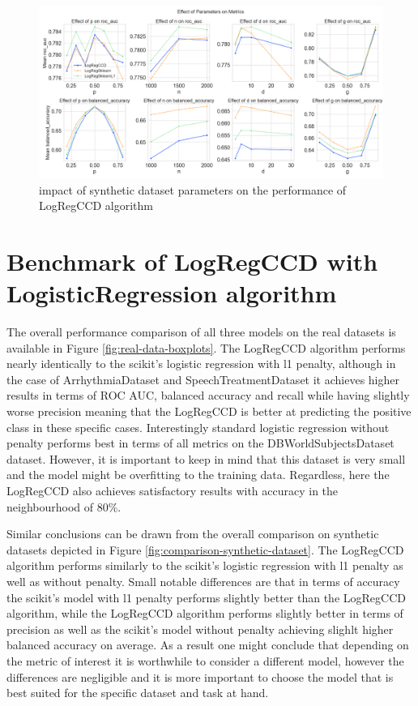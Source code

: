 \documentclass[12pt]{article}
\begin{document}
\begin{figure}[h]
    \centering
  \includegraphics[width=\textwidth]{../results/parameter_facet_grid.png}
    \caption{impact of synthetic dataset parameters on the performance of LogRegCCD algorithm}
    \label{fig:synthetic-dataset-parameters}
  \end{figure}

\section{Benchmark of LogRegCCD with LogisticRegression algorithm}






The overall performance comparison of all three models on the real datasets is available in Figure \ref{fig:real-data-boxplots}. The LogRegCCD algorithm performs nearly identically to the scikit's logistic regression with l1 penalty, although in the case of ArrhythmiaDataset and SpeechTreatmentDataset it achieves higher results in terms of ROC AUC, balanced accuracy and recall while having slightly worse precision meaning that the LogRegCCD is better at predicting the positive class in these specific cases. Interestingly standard logistic regression without penalty performs best in terms of all metrics on the DBWorldSubjectsDataset dataset. However, it is important to keep in mind that this dataset is very small and the model might be overfitting to the training data. Regardless, here the LogRegCCD also achieves satisfactory results with accuracy in the neighbourhood of 80\%. \par

Similar conclusions can be drawn from the overall comparison on synthetic datasets depicted in Figure \ref{fig:comparison-synthetic-dataset}. The LogRegCCD algorithm performs similarly to the scikit's logistic regression with l1 penalty as well as without penalty. Small notable differences are that in terms of accuracy the scikit's model with l1 penalty performs slightly better than the LogRegCCD algorithm, while the LogRegCCD algorithm performs slightly better in terms of precision as well as the scikit's model without penalty achieving slighlt higher balanced accuracy on average. As a result one might conclude that depending on the metric of interest it is worthwhile to consider a different model, however the differences are negligible and it is more important to choose the model that is best suited for the specific dataset and task at hand. \par
\end{document}
